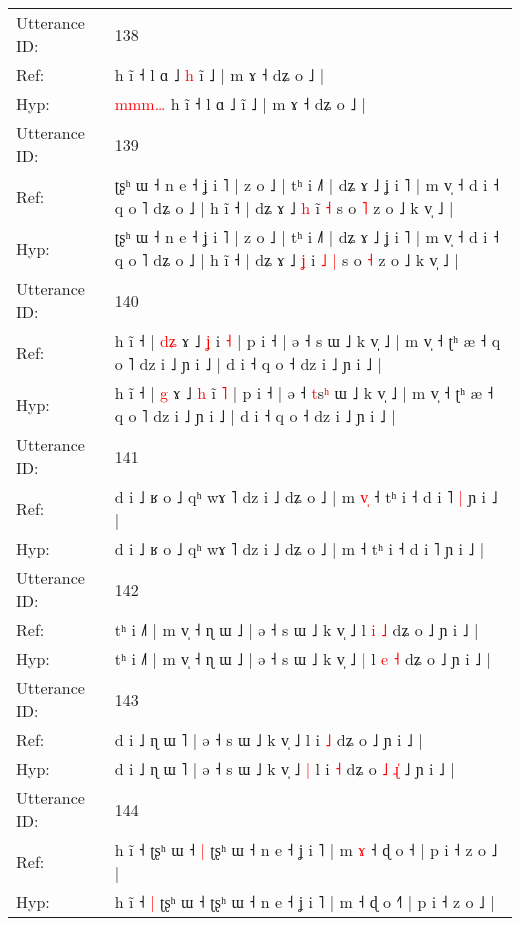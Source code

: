 \documentclass[10pt]{article}
\DeclareRobustCommand{\hl}[1]{{\textcolor{red}{#1}}}
\begin{document}
\begin{longtable}{ll}
 \\
\midrule
Utterance ID: & 138 \\
Ref: & \hl{}\hl{}\hl{}\hl{}\hl{}h ĩ ˧ l ɑ ˩\hl{ }\hl{h} ĩ ˩ | m ɤ ˧ dʑ o ˩ |
 \\
Hyp: & \hl{m}\hl{m}\hl{m}\hl{…}\hl{ }h ĩ ˧ l ɑ ˩\hl{}\hl{} ĩ ˩ | m ɤ ˧ dʑ o ˩ |
 \\
\midrule
Utterance ID: & 139 \\
Ref: & ʈʂʰ ɯ ˧ n e ˧ ʝ i ˥ | z o ˩ | tʰ i ˩˥ | dʑ ɤ ˩ ʝ i ˥ | m v̩ ˧ d i ˧ q o ˥ dʑ o ˩ | h ĩ ˧ | dʑ ɤ ˩ \hl{h} i\hl{}\hl{̃} \hl{˧} s o \hl{˥} z o ˩ k v̩ ˩ |
 \\
Hyp: & ʈʂʰ ɯ ˧ n e ˧ ʝ i ˥ | z o ˩ | tʰ i ˩˥ | dʑ ɤ ˩ ʝ i ˥ | m v̩ ˧ d i ˧ q o ˥ dʑ o ˩ | h ĩ ˧ | dʑ ɤ ˩ \hl{ʝ} i\hl{ }\hl{˩} \hl{|} s o \hl{˧} z o ˩ k v̩ ˩ |
 \\
\midrule
Utterance ID: & 140 \\
Ref: & h ĩ ˧ | \hl{d}\hl{ʑ} ɤ ˩ \hl{ʝ} i\hl{} \hl{˧} | p i ˧ | ə ˧ \hl{}s\hl{} ɯ ˩ k v̩ ˩ | m v̩ ˧ ʈʰ æ ˧ q o ˥ dz i ˩ ɲ i ˩ | d i ˧ q o ˧ dz i ˩ ɲ i ˩ |
 \\
Hyp: & h ĩ ˧ | \hl{}\hl{g} ɤ ˩ \hl{h} i\hl{̃} \hl{˥} | p i ˧ | ə ˧ \hl{t}s\hl{ʰ} ɯ ˩ k v̩ ˩ | m v̩ ˧ ʈʰ æ ˧ q o ˥ dz i ˩ ɲ i ˩ | d i ˧ q o ˧ dz i ˩ ɲ i ˩ |
 \\
\midrule
Utterance ID: & 141 \\
Ref: & d i ˩ ʁ o ˩ qʰ wɤ ˥ dz i ˩ dʑ o ˩ | m\hl{ }\hl{v}\hl{̩} ˧ tʰ i ˧ d i ˥\hl{ }\hl{|} ɲ i ˩ |
 \\
Hyp: & d i ˩ ʁ o ˩ qʰ wɤ ˥ dz i ˩ dʑ o ˩ | m\hl{}\hl{}\hl{} ˧ tʰ i ˧ d i ˥\hl{}\hl{} ɲ i ˩ |
 \\
\midrule
Utterance ID: & 142 \\
Ref: & tʰ i ˩˥ | m v̩ ˧ ɳ ɯ ˩ | ə ˧ s ɯ ˩ k v̩ ˩\hl{}\hl{} l \hl{i} \hl{˩} dʑ o ˩ ɲ i ˩ |
 \\
Hyp: & tʰ i ˩˥ | m v̩ ˧ ɳ ɯ ˩ | ə ˧ s ɯ ˩ k v̩ ˩\hl{ }\hl{|} l \hl{e} \hl{˧} dʑ o ˩ ɲ i ˩ |
 \\
\midrule
Utterance ID: & 143 \\
Ref: & d i ˩ ɳ ɯ ˥ | ə ˧ s ɯ ˩ k v̩ ˩\hl{}\hl{} l i \hl{˩} dʑ o\hl{}\hl{}\hl{}\hl{}\hl{} ˩ ɲ i ˩ |
 \\
Hyp: & d i ˩ ɳ ɯ ˥ | ə ˧ s ɯ ˩ k v̩ ˩\hl{ }\hl{|} l i \hl{˧} dʑ o\hl{ }\hl{˩}\hl{ }\hl{ɻ}\hl{̍} ˩ ɲ i ˩ |
 \\
\midrule
Utterance ID: & 144 \\
Ref: & h ĩ ˧\hl{}\hl{} ʈʂʰ ɯ ˧\hl{ }\hl{|} ʈʂʰ ɯ ˧ n e ˧ ʝ i ˥ | m\hl{ }\hl{ɤ} ˧ ɖ o ˧\hl{} | p i ˧ z o ˩ |
 \\
Hyp: & h ĩ ˧\hl{ }\hl{|} ʈʂʰ ɯ ˧\hl{}\hl{} ʈʂʰ ɯ ˧ n e ˧ ʝ i ˥ | m\hl{}\hl{} ˧ ɖ o ˧\hl{˥} | p i ˧ z o ˩ |

\end{longtable}
\end{document}
